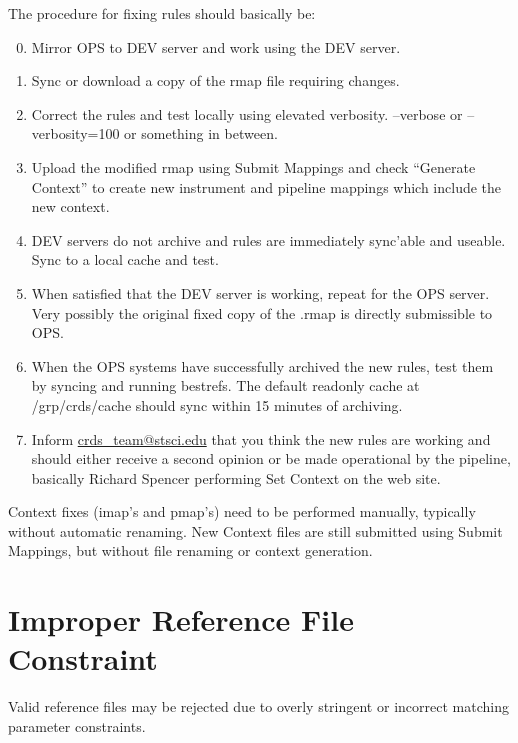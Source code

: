 \documentclass[letterpaper,10pt,english]{sphinxmanual}
\begin{document}
The procedure for fixing rules should basically be:
\begin{enumerate}
\setcounter{enumi}{-1}
\item {} 
Mirror OPS to DEV server and work using the DEV server.

\item {} 
Sync or download a copy of the rmap file requiring changes.

\item {} 
Correct the rules and test locally using elevated verbosity.  --verbose or --verbosity=100 or something in between.

\item {} 
Upload the modified rmap using Submit Mappings and check ``Generate Context'' to create new instrument and pipeline
mappings which include the new context.

\item {} 
DEV servers do not archive and rules are immediately sync'able and useable.   Sync to a local cache and test.

\item {} 
When satisfied that the DEV server is working,  repeat for the OPS server.  Very possibly the original fixed
copy of the .rmap is directly submissible to OPS.

\item {} 
When the OPS systems have successfully archived the new rules,  test them by syncing and running bestrefs.
The default readonly cache at /grp/crds/cache should sync within 15 minutes of archiving.

\item {} 
Inform \href{mailto:crds\_team@stsci.edu}{crds\_team@stsci.edu} that you think the new rules are working and should either receive a second
opinion or be made operational by the pipeline,  basically Richard Spencer performing Set Context on the
web site.

\end{enumerate}

Context fixes (imap's and pmap's) need to be performed manually,  typically without automatic renaming.   New Context
files are still submitted using Submit Mappings,  but without file renaming or context generation.


\section{Improper Reference File Constraint}
\label{server_guide:improper-reference-file-constraint}
Valid reference files may be rejected due to overly stringent or incorrect matching parameter constraints.
\end{document}
